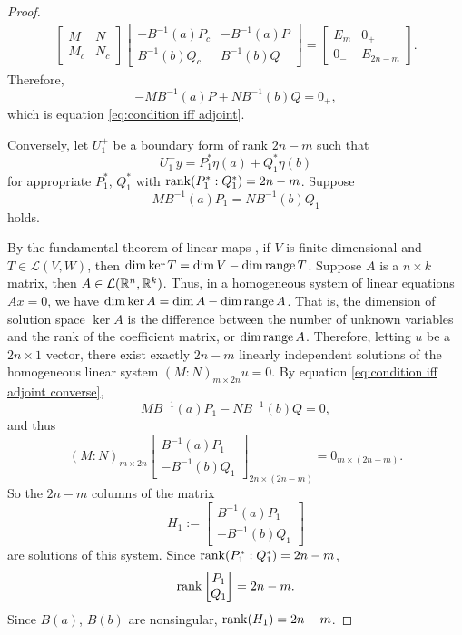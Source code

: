 \documentclass[12pt, oneside, a4paper]{article}
\begin{document}
\begin{proof}
    \begin{align*}
        \begin{bmatrix}
            M & N\\
            M_c & N_c
        \end{bmatrix}
        \begin{bmatrix}
            -B^{-1}(a)P_c & -B^{-1}(a)P\\
            B^{-1}(b)Q_c & B^{-1}(b)Q
        \end{bmatrix}
        =
        \begin{bmatrix}
            E_m & 0_+\\
            0_- & E_{2n-m}
        \end{bmatrix}.
    \end{align*}
    Therefore,
    \[-MB^{-1}(a)P + NB^{-1}(b)Q = 0_+,\]
    which is equation \eqref{eq:condition iff adjoint}.

    Conversely, let $U_1^+$ be a boundary form of rank $2n-m$ such that
    \[U_1^+y = P_1^*\eta(a) + Q_1^*\eta(b)\]
    for appropriate $P_1^*$, $Q_1^*$ with $\operatorname{rank}(P_1^*:Q_1^*)=2n-m$. Suppose
    \begin{equation}\label{eq:condition iff adjoint converse}
        MB^{-1}(a)P_1 = NB^{-1}(b)Q_1
    \end{equation}
    holds.

    By the fundamental theorem of linear maps \cite[p.63]{Axler1997}, if $V$ is finite-dimensional and $T\in\mathcal{L}(V, W)$, then $\dim\ker T = \dim V - \dim \operatorname{range} T$. Suppose $A$ is a $n\times k$ matrix, then $A\in\mathcal{L}(\mathbb R^n, \mathbb R^k)$. Thus, in a homogeneous system of linear equations $Ax=0$, we have $\dim \ker A = \dim A - \dim \operatorname{range} A$. That is, the dimension of solution space $\ker A$ is the difference between the number of unknown variables and the rank of the coefficient matrix, or $\dim\operatorname{range} A$. Therefore, letting $u$ be a $2n\times 1$ vector, there exist exactly $2n-m$ linearly independent solutions of the homogeneous linear system $(M:N)_{m\times 2n}u=0$. By equation \eqref{eq:condition iff adjoint converse},
    \[MB^{-1}(a)P_1 - NB^{-1}(b)Q=0,\]
    and thus
    \[(M:N)_{m\times 2n}\begin{bmatrix}
        B^{-1}(a)P_1\\
        -B^{-1}(b)Q_1
    \end{bmatrix}_{2n\times (2n-m)} = 0_{m\times (2n-m)}.\]
    So the $2n-m$ columns of the matrix
    \[H_1:= \begin{bmatrix}
        B^{-1}(a)P_1\\
        -B^{-1}(b)Q_1
    \end{bmatrix}\]
    are solutions of this system. Since $\operatorname{rank}(P_1^*:Q_1^*)=2n-m$,
    \[\operatorname{rank}\begin{bmatrix}P_1\\ Q_1\end{bmatrix}=2n-m.\]
    Since $B(a)$, $B(b)$ are nonsingular, $\operatorname{rank}(H_1)=2n-m$.


\end{proof}
\end{document}
